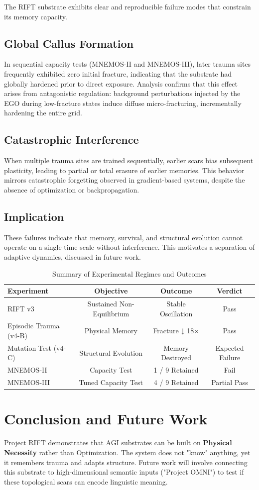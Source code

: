 \documentclass[11pt, a4paper]{article}
\begin{document}
The RIFT substrate exhibits clear and reproducible failure modes that constrain its memory capacity.

\subsection{Global Callus Formation}
In sequential capacity tests (MNEMOS-II and MNEMOS-III), later trauma sites frequently exhibited zero initial fracture, indicating that the substrate had globally hardened prior to direct exposure. Analysis confirms that this effect arises from antagonistic regulation: background perturbations injected by the EGO during low-fracture states induce diffuse micro-fracturing, incrementally hardening the entire grid.

\subsection{Catastrophic Interference}
When multiple trauma sites are trained sequentially, earlier scars bias subsequent plasticity, leading to partial or total erasure of earlier memories. This behavior mirrors catastrophic forgetting observed in gradient-based systems, despite the absence of optimization or backpropagation.

\subsection{Implication}
These failures indicate that memory, survival, and structural evolution cannot operate on a single time scale without interference. This motivates a separation of adaptive dynamics, discussed in future work.

\begin{table}[H]
\centering
\begin{tabular}{lccc}
\toprule
Experiment & Objective & Outcome & Verdict \\
\midrule
RIFT v3 & Sustained Non-Equilibrium & Stable Oscillation & Pass \\
Episodic Trauma (v4-B) & Physical Memory & Fracture ↓ 18× & Pass \\
Mutation Test (v4-C) & Structural Evolution & Memory Destroyed & Expected Failure \\
MNEMOS-II & Capacity Test & 1 / 9 Retained & Fail \\
MNEMOS-III & Tuned Capacity Test & 4 / 9 Retained & Partial Pass \\
\bottomrule
\end{tabular}
\caption{Summary of Experimental Regimes and Outcomes}
\end{table}


\section{Conclusion and Future Work}
Project RIFT demonstrates that AGI substrates can be built on \textbf{Physical Necessity} rather than Optimization. The system does not "know" anything, yet it remembers trauma and adapts structure. Future work will involve connecting this substrate to high-dimensional semantic inputs ("Project OMNI") to test if these topological scars can encode linguistic meaning.
\end{document}
